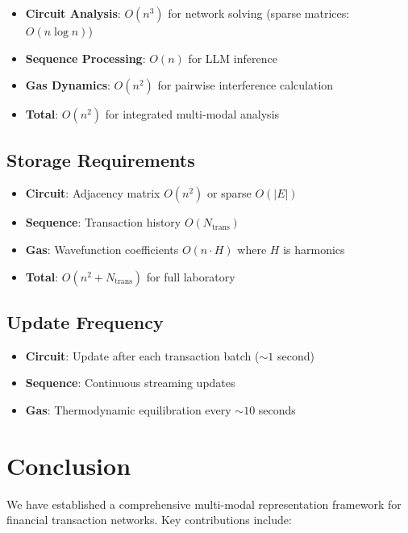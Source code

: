 \documentclass[12pt]{article}
\begin{document}
\begin{itemize}
    \item \textbf{Circuit Analysis}: $O(n^3)$ for network solving (sparse matrices: $O(n \log n)$)
    \item \textbf{Sequence Processing}: $O(n)$ for LLM inference
    \item \textbf{Gas Dynamics}: $O(n^2)$ for pairwise interference calculation
    \item \textbf{Total}: $O(n^2)$ for integrated multi-modal analysis
\end{itemize}

\subsection{Storage Requirements}

\begin{itemize}
    \item \textbf{Circuit}: Adjacency matrix $O(n^2)$ or sparse $O(|E|)$
    \item \textbf{Sequence}: Transaction history $O(N_{\text{trans}})$
    \item \textbf{Gas}: Wavefunction coefficients $O(n \cdot H)$ where $H$ is harmonics
    \item \textbf{Total}: $O(n^2 + N_{\text{trans}})$ for full laboratory
\end{itemize}

\subsection{Update Frequency}

\begin{itemize}
    \item \textbf{Circuit}: Update after each transaction batch ($\sim 1$ second)
    \item \textbf{Sequence}: Continuous streaming updates
    \item \textbf{Gas}: Thermodynamic equilibration every $\sim 10$ seconds
\end{itemize}

\section{Conclusion}

We have established a comprehensive multi-modal representation framework for financial transaction networks. Key contributions include:
\end{document}
